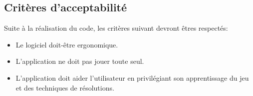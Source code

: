 \subsection{Critères d’acceptabilité}
Suite à la réalisation du code, les critères suivant devront êtres respectés:
\begin{itemize}
	\item Le logiciel doit-être ergonomique.
	\item L’application ne doit pas jouer toute seul.
	\item L'application doit aider l'utilisateur en privilégiant son apprentissage du jeu et des techniques de résolutions.
\end{itemize}
